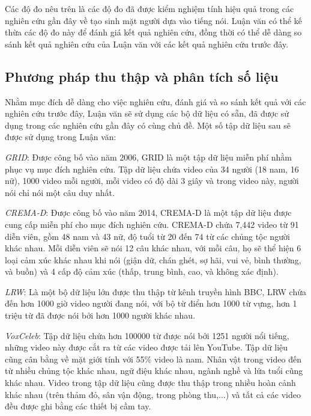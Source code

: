 Các độ đo nêu trên là các độ đo đã được kiểm nghiệm tính hiệu quả trong các nghiên cứu gần đây về tạo sinh mặt người dựa vào tiếng nói. Luận văn có thể kế thừa các độ đo này để đánh giá kết quả nghiên cứu, đồng thời có thể dễ dàng so sánh kết quả nghiên cứu của Luận văn với các kết quả nghiên cứu trước đây.

\subsection{\texorpdfstring{Phương pháp thu thập và phân tích số liệu}{Empty}}
Nhằm mục đích dễ dàng cho việc nghiên cứu, đánh giá và so sánh kết quả với các nghiên cứu trước đây, Luận văn sẽ sử dụng các bộ dữ liệu có sẵn, đã được sử dụng trong các nghiên cứu gần đây có cùng chủ đề. Một số tập dữ liệu sau sẽ được sử dụng trong Luận văn:

\textit{GRID}\cite{grid}: Được công bố vào năm 2006, GRID là một tập dữ liệu miễn phí nhằm phục vụ mục đích nghiên cứu. Tập dữ liệu chứa video của 34 người (18 nam, 16 nữ), 1000 video mỗi người, mỗi video có độ dài 3 giây và trong video này, người nói chỉ nói một câu duy nhất.

\textit{CREMA-D}\cite{crema-d}: Được công bố vào năm 2014, CREMA-D là một tập dữ liệu được cung cấp miễn phí cho mục đích nghiên cứu. CREMA-D chứa 7,442 video từ 91 diễn viên, gồm 48 nam và 43 nữ, độ tuổi từ 20 đến 74 từ các chủng tộc người khác nhau. Mỗi diễn viên sẽ nói 12 câu khác nhau, với mỗi câu, họ sẽ thể hiện 6 loại cảm xúc khác nhau khi nói (giận dữ, chán ghét, sợ hãi, vui vẻ, bình thường, và buồn) và 4 cấp độ cảm xúc (thấp, trung bình, cao, và không xác định).

\textit{LRW}\cite{lrw}: Là một bộ dữ liệu lớn được thu thập từ kênh truyền hình BBC, LRW chứa đến hơn 1000 giờ video người đang nói, với bộ từ điển hơn 1000 từ vựng, hơn 1 triệu từ đã được nói bởi hơn 1000 người khác nhau.

\textit{VoxCeleb}\cite{vox}: Tập dữ liệu chứa hơn 100000 từ được nói bởi 1251 người nổi tiếng, những video này được cắt ra từ các video được tải lên YouTube. Tập dữ liệu cũng cân bằng về mặt giới tính với 55\% video là nam. Nhân vật trong video đến từ nhiều chủng tộc khác nhau, ngữ điệu khác nhau, ngành nghề và lứa tuổi cũng khác nhau. Video trong tập dữ liệu cũng được thu thập trong nhiều hoàn cảnh khác nhau (trên thảm đỏ, sân vận động, trong phòng thu,...) và tất cả các video đều được ghi bằng các thiết bị cầm tay.

